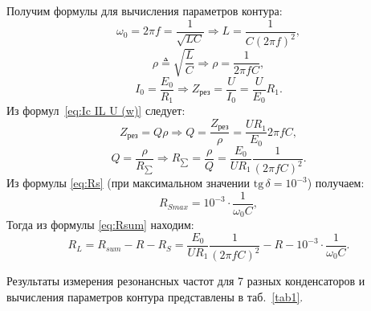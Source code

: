\documentclass[a4paper, 12pt]{article}
\begin{document}
Получим формулы для вычисления параметров контура:
\begin{equation}
\omega_0 = 2\pi f = \frac{1}{\sqrt{L C}} \Rightarrow L = \frac{1}{C(2\pi f)^2},
\end{equation}
\begin{equation}
\rho \triangleq \sqrt{\frac{L}{C}} \Rightarrow \rho = \frac{1}{2\pi fC},
\end{equation}
\begin{equation}
I_0 = \frac{E_0}{R_1} \Rightarrow Z_{\text{рез}} = \frac{U}{I_0} = \frac{U}{E_0}R_1.
\end{equation}
Из формул~\eqref{eq:Ic IL U (w)} следует:
\begin{equation}
Z_{рез} = Q \rho \Rightarrow Q = \frac{Z_{рез}}{\rho} = \frac{UR_1}{E_0}2\pi fC,
\end{equation}
\begin{equation}
Q = \frac{\rho}{R_{\sum}} \Rightarrow R_{\sum} = \frac{\rho}{Q} = \frac{E_0}{UR_1}\frac{1}{(2\pi fC)^2}.
\end{equation}
Из формулы \eqref{eq:Rs} (при максимальном значении $\mathrm{tg}\,\delta = 10^{-3}$) получаем:
\begin{equation}
R_{Smax} =10^{-3}\cdot\frac{1}{\omega_0C},
\end{equation}
Тогда из формулы \eqref{eq:Rsum} находим:
\begin{equation}
R_L = R_{sum} - R - R_S = \frac{E_0}{UR_1}\frac{1}{(2\pi fC)^2}-R-10^{-3}\cdot\frac{1}{\omega_0C}.
\end{equation}

Результаты измерения резонансных частот для 7 разных конденсаторов и вычисления параметров контура представлены в таб.~\ref{tab1}. 
\end{document}
